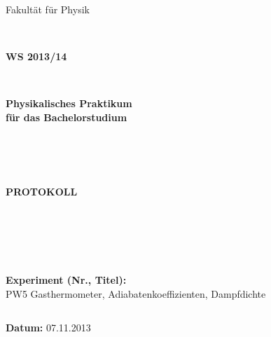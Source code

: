 \documentclass[12pt,a4paper]{article}
\begin{document}
%
%

%




\thispagestyle{empty}
			\begin{center}
			\Large{Fakultät für Physik}\\
			\end{center}
\begin{verbatim}


\end{verbatim}
			\begin{center}
			\textbf{\LARGE WS 2013/14}
			\end{center}
\begin{verbatim}


\end{verbatim}
			\begin{center}
			\textbf{\LARGE{Physikalisches Praktikum\\ für das Bachelorstudium}}
			\end{center}
\begin{verbatim}




\end{verbatim}

			\begin{center}
			\textbf{\LARGE{PROTOKOLL}}
			\end{center}
			
\begin{verbatim}





\end{verbatim}

			\begin{flushleft}
			\textbf{\Large{Experiment (Nr., Titel):}}\\
			\LARGE{PW5 Gasthermometer, Adiabatenkoeffizienten, Dampfdichte}	
			\end{flushleft}

\begin{verbatim}

\end{verbatim}	
			\begin{flushleft}
			\textbf{\Large{Datum:}} \Large{07.11.2013}
			\end{flushleft}
			
\end{document}
